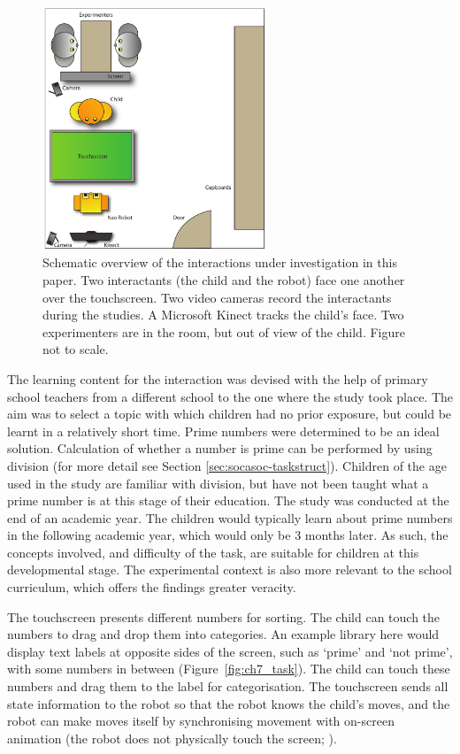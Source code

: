 \begin{figure}[t!]
    \centering
    \includegraphics[width=0.6\textwidth]{images/ch7_schematic_compressed.pdf}
    \caption{Schematic overview of the interactions under investigation in this paper. Two interactants (the child and the robot) face one another over the touchscreen. Two video cameras record the interactants during the studies. A Microsoft Kinect tracks the child's face. Two experimenters are in the room, but out of view of the child. Figure not to scale.}
    \label{fig:ch7_schem}
\end{figure}

The \gls{learning} content for the interaction was devised with the help of primary school teachers from a different school to the one where the study took place. The aim was to select a topic with which children had no prior exposure, but could be learnt in a relatively short time. Prime numbers were determined to be an ideal solution. Calculation of whether a number is prime can be performed by using division (for more detail see Section \ref{sec:socasoc-taskstruct}). Children of the age used in the study are familiar with division, but have not been taught what a prime number is at this stage of their education. The study was conducted at the end of an academic year. The children would typically learn about prime numbers in the following academic year, which would only be 3 months later. As such, the concepts involved, and difficulty of the task, are suitable for children at this developmental stage. The experimental context is also more relevant to the school curriculum, which offers the findings greater veracity.

The touchscreen presents different numbers for sorting. The child can touch the numbers to drag and drop them into categories. An example library here would display text labels at opposite sides of the screen, such as `prime' and `not prime', with some numbers in between (Figure~\ref{fig:ch7_task}). The child can touch these numbers and drag them to the label for categorisation. The touchscreen sends all state information to the robot so that the robot knows the child's moves, and the robot can make moves itself by synchronising movement with on-screen animation (the robot does not physically touch the screen; \citealp{baxter2012touchscreen}).

